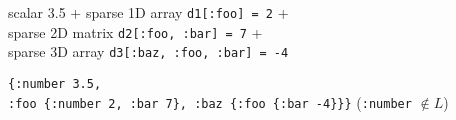 \documentclass{beamer}
\newcommand{\msdark}[1]{{\color{mydark} #1}}
\begin{document}
\begin{frame}
\begin{columns}[T]
\begin{column}{0.5\textwidth}
\begin{itemize}
{ \item {\tiny  scalar 3.5 + sparse 1D array {\tt d1[:foo] = 2} +\\[1.5ex] sparse 2D
matrix {\tt d2[:foo, :bar] = 7} +\\  sparse 3D array {\tt d3[:baz, :foo, :bar] = -4}}

 \item {\tt \{:number 3.5,\\ :foo \{:number 2, :bar 7\}, :baz \{:foo \{:bar -4\}\}\}}
\msdark{ %
          ({\tt :number} $\not\in L$)
}

}

\end{itemize}

\end{column}
\end{columns}

\end{frame}
\end{document}
